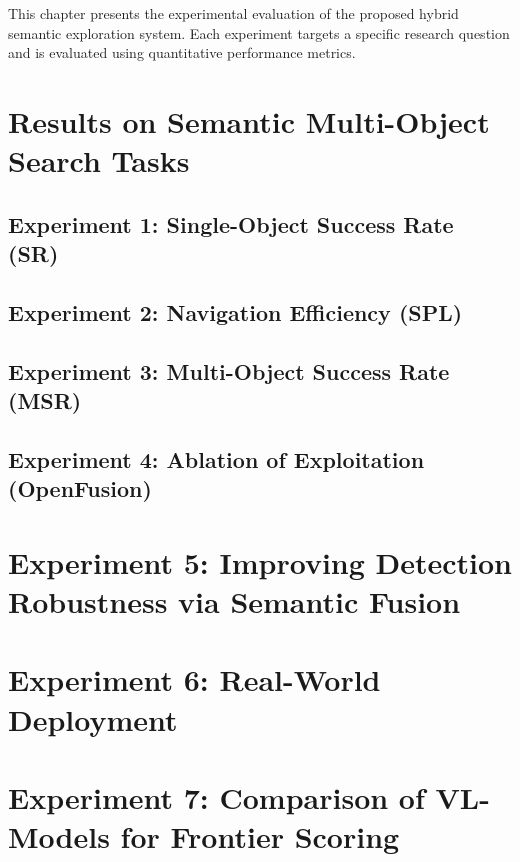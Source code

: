 This chapter presents the experimental evaluation of the proposed hybrid semantic exploration system. Each experiment targets a specific research question and is evaluated using quantitative performance metrics.

\section{Results on Semantic Multi-Object Search Tasks}

\subsection{Experiment 1: Single-Object Success Rate (SR)}

\subsection{Experiment 2: Navigation Efficiency (SPL)}

\subsection{Experiment 3: Multi-Object Success Rate (MSR)}

\subsection{Experiment 4: Ablation of Exploitation (OpenFusion)}

\section{Experiment 5: Improving Detection Robustness via Semantic Fusion}

\section{Experiment 6: Real-World Deployment}

\section{Experiment 7: Comparison of VL-Models for Frontier Scoring}
